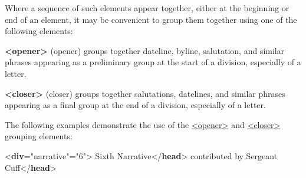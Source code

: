 Where a sequence of such elements appear together, either at the beginning or end of an element, it may be convenient to group them together using one of the following elements: 
\begin{sansreflist}
  
\item [\textbf{<opener>}] (opener) groups together dateline, byline, salutation, and similar phrases appearing as a preliminary group at the start of a division, especially of a letter.
\item [\textbf{<closer>}] (closer) groups together salutations, datelines, and similar phrases appearing as a final group at the end of a division, especially of a letter.
\end{sansreflist}
 The following examples demonstrate the use of the \hyperref[TEI.opener]{<opener>} and \hyperref[TEI.closer]{<closer>} grouping elements: \par\bgroup{}\exampleFont \begin{shaded}\noindent\mbox{}{<\textbf{div}\hspace*{1em}{type}="{narrative}"\hspace*{1em}{n}="{6}">}\mbox{}\newline 
{}Sixth Narrative{</\textbf{head}>}\mbox{}\newline 
{}contributed by Sergeant Cuff{</\textbf{head}>}\mbox{}\newline 
{}\mbox{}\newline 
\hspace*{1em}\mbox{}\newline 

\end{shaded}
